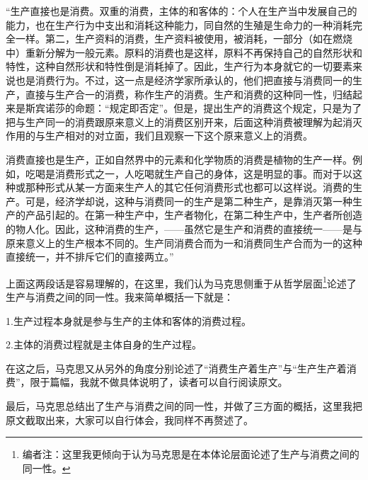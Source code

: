 \documentclass[a4paper,twoside,12pt,AutoFakeBold]{ctexart}
\begin{document}
\begin{adjustwidth}{2em}{2em}
    \qquad\fangsong
“生产直接也是消费。双重的消费，主体的和客体的：个人在生产当中发展自己的能力，也在生产行为中支出和消耗这种能力，同自然的生殖是生命力的一种消耗完全一样。第二，生产资料的消费，生产资料被使用，被消耗，一部分（如在燃烧中）重新分解为一般元素。原料的消费也是这样，原料不再保持自己的自然形状和特性，这种自然形状和特性倒是消耗掉了。因此，生产行为本身就它的一切要素来说也是消费行为。不过，这一点是经济学家所承认的，他们把直接与消费同一的生产，直接与生产合一的消费，称作生产的消费。生产和消费的这种同一性，归结起来是斯宾诺莎的命题：“规定即否定”。但是，提出生产的消费这个规定，只是为了把与生产同一的消费跟原来意义上的消费区别开来，后面这种消费被理解为起消灭作用的与生产相对的对立面，我们且观察一下这个原来意义上的消费。

消费直接也是生产，正如自然界中的元素和化学物质的消费是植物的生产一样。例如，吃喝是消费形式之一，人吃喝就生产自己的身体，这是明显的事。而对于以这种或那种形式从某一方面来生产人的其它任何消费形式也都可以这样说。消费的生产。可是，经济学却说，这种与消费同一的生产是第二种生产，是靠消灭第一种生产的产品引起的。在第一种生产中，生产者物化，在第二种生产中，生产者所创造的物人化。因此，这种消费的生产，——虽然它是生产和消费的直接统一——是与原来意义上的生产根本不同的。生产同消费合而为一和消费同生产合而为一的这种直接统一，并不排斥它们的直接两立。”
\end{adjustwidth}
\vspace{0.3cm}
上面这两段话是容易理解的，在这里，我们认为马克思侧重于从哲学层面\footnote{编者注：这里我更倾向于认为马克思是在本体论层面论述了生产与消费之间的同一性。}论述了生产与消费之间的同一性。我来简单概括一下就是：
\begin{tcolorbox}[colback=gray!20, colframe=gray!100, sharp corners, leftrule={3pt}, rightrule={0pt}, toprule={0pt}, bottomrule={0pt}, left={2pt}, right={2pt}, top={3pt}, bottom={3pt}] 
  1.生产过程本身就是参与生产的主体和客体的消费过程。
  
  2.主体的消费过程就是主体自身的生产过程。
  
\end{tcolorbox}

在这之后，马克思又从另外的角度分别论述了“消费生产着生产”与“生产生产着消费”，限于篇幅，我就不做具体说明了，读者可以自行阅读原文。

最后，马克思总结出了生产与消费之间的同一性，并做了三方面的概括，这里我把原文截取出来，大家可以自行体会，我同样不再赘述了。
\end{document}
